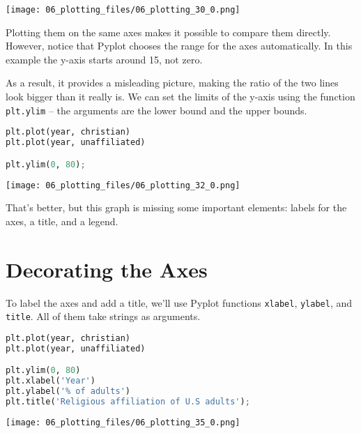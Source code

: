 \begin{center}
\texttt{[image: 06\_plotting\_files/06\_plotting\_30\_0.png]}
\end{center}

Plotting them on the same axes makes it possible to compare them
directly. However, notice that Pyplot chooses the range for the axes
automatically. In this example the y-axis starts around 15, not zero.

As a result, it provides a misleading picture, making the ratio of the
two lines look bigger than it really is. We can set the limits of the
y-axis using the function \passthrough{\lstinline!plt.ylim!} -- the
arguments are the lower bound and the upper bounds.

\begin{lstlisting}[language=Python,style=source]
plt.plot(year, christian)
plt.plot(year, unaffiliated)

plt.ylim(0, 80);
\end{lstlisting}

\begin{center}
\texttt{[image: 06\_plotting\_files/06\_plotting\_32\_0.png]}
\end{center}

That's better, but this graph is missing some important elements: labels
for the axes, a title, and a legend.

\section{Decorating the Axes}\label{decorating-the-axes}

To label the axes and add a title, we'll use Pyplot functions
\passthrough{\lstinline!xlabel!}, \passthrough{\lstinline!ylabel!}, and
\passthrough{\lstinline!title!}. All of them take strings as arguments.

\begin{lstlisting}[language=Python,style=source]
plt.plot(year, christian)
plt.plot(year, unaffiliated)

plt.ylim(0, 80)
plt.xlabel('Year')
plt.ylabel('% of adults')
plt.title('Religious affiliation of U.S adults');
\end{lstlisting}

\begin{center}
\texttt{[image: 06\_plotting\_files/06\_plotting\_35\_0.png]}
\end{center}


